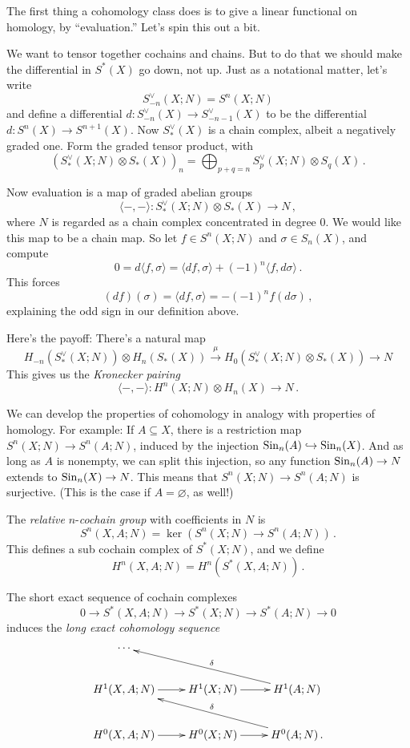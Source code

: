 The first thing a cohomology class does is to give a linear functional
on homology, by ``evaluation.'' Let's spin this out a bit. 

We want to tensor together cochains and chains. But to do that we should make
the differential in $S^*(X)$ go down, not up. Just as a notational matter, 
let's write
\[
S^\vee_{-n}(X;N)=S^n(X;N)
\]
and define a differential $d:S^\vee_{-n}(X)\to S^\vee_{-n-1}(X)$ to be the
differential $d:S^n(X)\to S^{n+1}(X)$. Now $S^\vee_\ast(X)$ is a chain
complex, albeit a negatively graded one. Form the graded tensor product, with
\[
\left(S^\vee_\ast(X;N)\otimes S_\ast(X)\right)_n=
\bigoplus_{p+q=n}S^\vee_p(X;N)\otimes S_q(X)\,.
\]

Now evaluation is a map of graded abelian groups
\[
\langle-,-\rangle:S^\vee_\ast(X;N)\otimes S_\ast(X)\to N\,,
\]
where $N$ is regarded as a chain complex concentrated in degree 0.
We would like this map to be a chain map. So let $f\in S^n(X;N)$ and 
$\sigma\in S_n(X)$, and compute
\[
0 = d\langle f,\sigma\rangle=
\langle df,\sigma\rangle+(-1)^n\langle f,d\sigma\rangle\,.
\]
This forces 
\[
(df)(\sigma)=\langle df,\sigma\rangle=-(-1)^nf(d\sigma)\,,
\]
explaining the odd sign in our definition above. 

Here's the payoff: There's a natural map 
\[
H_{-n}(S^\vee_\ast(X;N))\otimes H_n(S_\ast(X))\xrightarrow{\mu} 
H_0\left(S^\vee_\ast(X;N)\otimes S_\ast(X)\right)\to N
\]
This gives us the {\em Kronecker pairing}
\[
\langle-,-\rangle:H^n(X;N)\otimes H_n(X)\to N\,.
\]

We can develop the properties of cohomology in analogy with properties
of homology. For example:
If $A\subseteq X$, there is a restriction map $S^n(X;N)\to S^n(A;N)$, induced by the injection $\mathrm{Sin}_n(A)\hookrightarrow \mathrm{Sin}_n(X)$. 
And as long as $A$ is nonempty, we can split this injection, so any function $\mathrm{Sin}_n(A)\to N$ extends to $\mathrm{Sin}_n(X)\to N$. This means that $S^n(X;N)\to S^n(A;N)$ is surjective. (This is the case if $A=\varnothing$, as well!) 
\begin{definition} The {\em relative} $n$-{\em cochain group} with coefficients in $N$ is
\[
S^n(X,A;N)=\ker\left(S^n(X;N)\to S^n(A;N)\right)\,.
\]
This defines a sub cochain complex of $S^\ast(X;N)$, and we define
\[
H^n(X,A;N)=H^n(S^\ast(X,A;N))\,.
\]
\end{definition}

The short exact sequence of cochain complexes
\[
0\to S^\ast(X,A;N)\to S^\ast(X;N)\to S^\ast(A;N)\to0
\]
induces the {\em long exact cohomology sequence}
\begin{equation*}
\xymatrix{
	\cdots & & \\
	 H^1(X,A;N)\ar[r] & H^1(X;N)\ar[r] & H^1(A;N)\ar[ull]_{\delta}\\
	 H^0(X,A;N)\ar[r] & H^0(X;N)\ar[r] & H^0(A;N)\ar[ull]_{\delta}\,.
}
\end{equation*}

